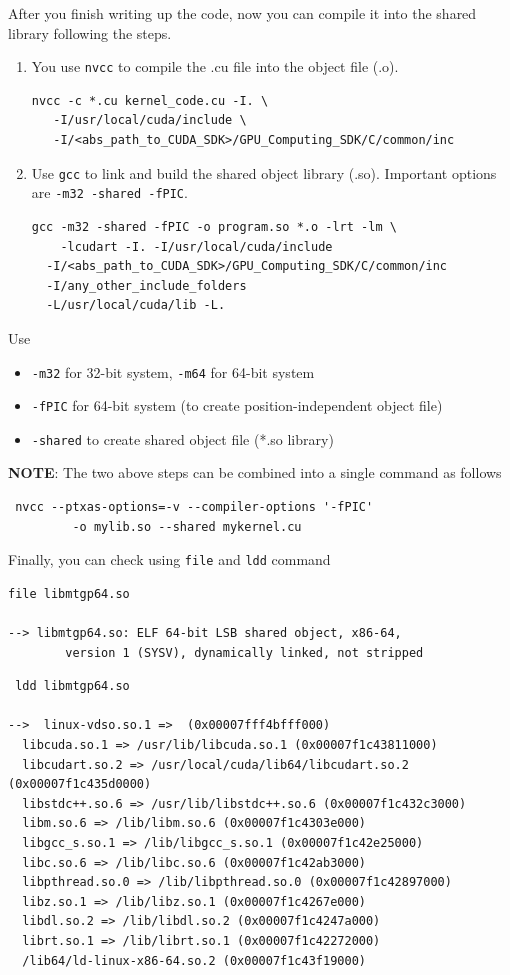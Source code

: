After you finish writing up the code, now you can compile it into the
shared library following the steps.
\begin{enumerate}
\item You use \verb!nvcc! to compile the .cu file into the
  object file (.o).
\begin{verbatim}
nvcc -c *.cu kernel_code.cu -I. \
   -I/usr/local/cuda/include \
   -I/<abs_path_to_CUDA_SDK>/GPU_Computing_SDK/C/common/inc
\end{verbatim}

\item Use \verb!gcc! to link and build the shared object
  library (.so). Important options are \verb!-m32 -shared -fPIC!.
\begin{verbatim}
gcc -m32 -shared -fPIC -o program.so *.o -lrt -lm \
    -lcudart -I. -I/usr/local/cuda/include 
  -I/<abs_path_to_CUDA_SDK>/GPU_Computing_SDK/C/common/inc 
  -I/any_other_include_folders
  -L/usr/local/cuda/lib -L.
\end{verbatim}
\end{enumerate}

\begin{framed}
  Use
\begin{itemize}
\item \verb!-m32! for 32-bit system, \verb!-m64! for 64-bit system
\item \verb!-fPIC! for 64-bit system (to create position-independent object file)
\item \verb!-shared! to create shared object file (*.so library)
\end{itemize}
\end{framed}

{\bf NOTE}: The two above steps can be combined into a single command
as follows
\begin{verbatim}
 nvcc --ptxas-options=-v --compiler-options '-fPIC' 
         -o mylib.so --shared mykernel.cu
\end{verbatim}
Finally, you can check using \verb!file! and \verb!ldd! command
\begin{verbatim}
file libmtgp64.so 

--> libmtgp64.so: ELF 64-bit LSB shared object, x86-64, 
        version 1 (SYSV), dynamically linked, not stripped
\end{verbatim}
\begin{verbatim}
 ldd libmtgp64.so 

-->  linux-vdso.so.1 =>  (0x00007fff4bfff000)
  libcuda.so.1 => /usr/lib/libcuda.so.1 (0x00007f1c43811000)
  libcudart.so.2 => /usr/local/cuda/lib64/libcudart.so.2 (0x00007f1c435d0000)
  libstdc++.so.6 => /usr/lib/libstdc++.so.6 (0x00007f1c432c3000)
  libm.so.6 => /lib/libm.so.6 (0x00007f1c4303e000)
  libgcc_s.so.1 => /lib/libgcc_s.so.1 (0x00007f1c42e25000)
  libc.so.6 => /lib/libc.so.6 (0x00007f1c42ab3000)
  libpthread.so.0 => /lib/libpthread.so.0 (0x00007f1c42897000)
  libz.so.1 => /lib/libz.so.1 (0x00007f1c4267e000)
  libdl.so.2 => /lib/libdl.so.2 (0x00007f1c4247a000)
  librt.so.1 => /lib/librt.so.1 (0x00007f1c42272000)
  /lib64/ld-linux-x86-64.so.2 (0x00007f1c43f19000)
\end{verbatim}


